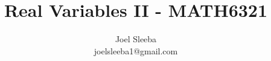 \documentclass[12pt]{report}
\theoremstyle{plain} %
\theoremstyle{definition} %
\theoremstyle{remark} %
\begin{document}
\title{Real Variables II - MATH6321}


\author{
  Joel Sleeba \\
  joelsleeba1@gmail.com \\
}

\maketitle

 \setcounter{page}{2}
\tableofcontents
{} \setcounter{page}{1}










\printbibliography[heading=bibintoc]
\end{document}
